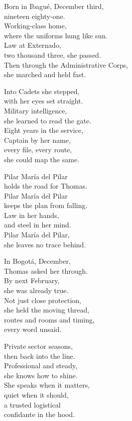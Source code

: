 \begin{lyrics}
Born in Ibagué, December third,\\
nineteen eighty-one.\\
Working-class home,\\
where the uniforms hung like sun.\\
Law at Externado,\\
two thousand three, she passed.\\
Then through the Administrative Corps,\\
she marched and held fast.

Into Cadets she stepped,\\
with her eyes set straight.\\
Military intelligence,\\
she learned to read the gate.\\
Eight years in the service,\\
Captain by her name,\\
every file, every route,\\
she could map the same.

Pilar María del Pilar\\
holds the road for Thomas.\\
Pilar María del Pilar\\
keeps the plan from falling.\\
Law in her hands,\\
and steel in her mind.\\
Pilar María del Pilar,\\
she leaves no trace behind.

In Bogotá, December,\\
Thomas asked her through.\\
By next February,\\
she was already true.\\
Not just close protection,\\
she held the moving thread,\\
routes and rooms and timing,\\
every word unsaid.

Private sector seasons,\\
then back into the line.\\
Professional and steady,\\
she knows how to shine.\\
She speaks when it matters,\\
quiet when it should,\\
a trusted logistical\\
confidante in the hood.


\end{lyrics}
